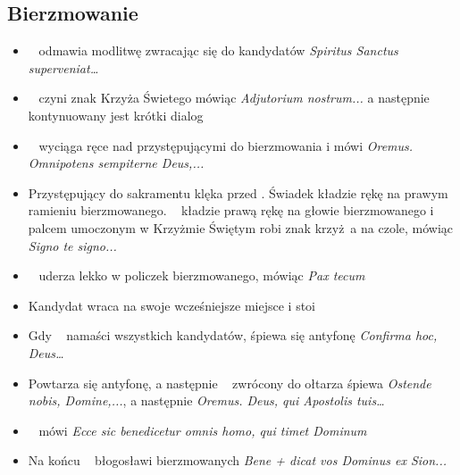 \subsection{Bierzmowanie}
\label{sec:bierz}
\begin{itemize}
      \item \ii~ odmawia modlitwę zwracając się do kandydatów \textit{Spiritus
                  Sanctus superveniat\dots}
      \item \ii~ czyni znak Krzyża Świetego mówiąc \textit{Adjutorium
                  nostrum...} a następnie kontynuowany jest krótki dialog
      \item \ii~ wyciąga ręce nad przystępującymi do bierzmowania i mówi \textit{Oremus.
                  Omnipotens sempiterne Deus,...}
      \item Przystępujący do sakramentu klęka przed \ii. Świadek kładzie
            rękę na prawym ramieniu bierzmowanego. \ii~ kładzie prawą rękę na
            głowie bierzmowanego i palcem umoczonym w Krzyżmie Świętym robi znak
            krzyż a na czole, mówiąc \textit{Signo te signo...}
      \item \ii~ uderza lekko w policzek bierzmowanego, mówiąc \textit{Pax tecum}
      \item Kandydat wraca na swoje wcześniejsze miejsce i stoi
      \item Gdy \ii~ namaści wszystkich kandydatów, śpiewa się antyfonę
            \textit{Confirma hoc, Deus\dots}
      \item Powtarza się antyfonę, a następnie \ii~ zwrócony do ołtarza śpiewa
            \textit{Ostende nobis, Domine,...}, a następnie \textit{Oremus.
                  Deus, qui Apostolis tuis\dots}
      \item \ii~ mówi \textit{Ecce sic benedicetur omnis homo, qui timet Dominum}
      \item Na końcu \ii~ błogosławi bierzmowanych \textit{Bene + dicat vos Dominus ex Sion...}
\end{itemize}